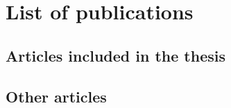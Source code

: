\chapter*{List of publications}
\section*{Articles included in the thesis}
\begin{refsection}[ownpubs]
  \small%
  \nocite{*}
  \printbibliography[heading=none, type=article]
\end{refsection}


\noindent
\section*{Other articles}
\begin{refsection}[preprints]
  \small%
  \nocite{*}
  \printbibliography[heading=none, type={article}]
\end{refsection}
